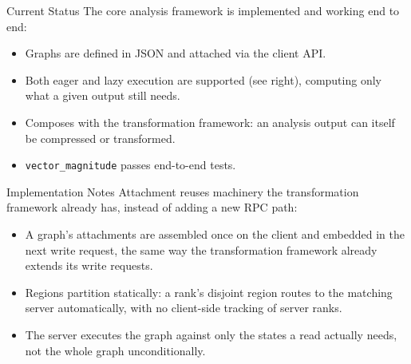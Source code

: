 \documentclass[final]{beamer}
\newlength{\colwid}
\newcommand{\diagfont}{\fontsize{15}{17}\selectfont}
\newcommand{\diagsmallfont}{\fontsize{11}{13}\selectfont}
\begin{document}
\begin{frame}[t]
\begin{columns}[t]
\begin{column}{\colwid}
\begin{block}{Current Status}
The core analysis framework is implemented and working end to end:
\begin{itemize}
  \item Graphs are defined in JSON and attached via the client API.
  \item Both eager and lazy execution are supported (see right), computing
        only what a given output still needs.
  \item Composes with the transformation framework: an analysis output can
        itself be compressed or transformed.
  \item \texttt{vector\_magnitude} passes end-to-end tests.
\end{itemize}
\end{block}

\begin{block}{Implementation Notes}
Attachment reuses machinery the transformation framework already has, instead
of adding a new RPC path:
\begin{itemize}
  \item A graph's attachments are assembled once on the client and embedded
        in the next write request, the same way the transformation framework
        already extends its write requests.
  \item Regions partition statically: a rank's disjoint region routes to the
        matching server automatically, with no client-side tracking of
        server ranks.
  \item The server executes the graph against only the states a read
        actually needs, not the whole graph unconditionally.
\end{itemize}

\begin{center}
  \begin{figure}
\end{figure}
\end{center}
\end{block}
\end{column}
\end{columns}
\end{frame}
\end{document}
